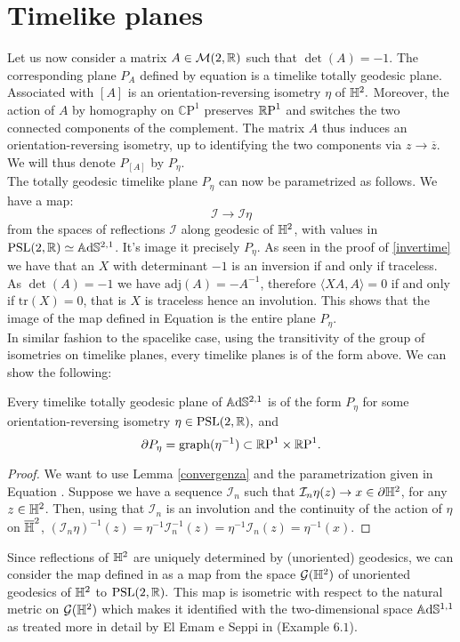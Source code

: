 \section{Timelike planes}
Let us now consider a matrix $A\in\mathcal{M}(2,\R)$ such that $\det(A)=-1.$ The corresponding plane $P_A$ defined by equation  is a timelike totally geodesic plane. Associated with $[A]$ is an orientation-reversing isometry $\eta$ of $\H^2.$ Moreover, the action of $A$ by homography on $\mathbb{C}\text{P}^1$ preserves $\S$ and switches the two connected components of the complement. The matrix $A$ thus induces an orientation-reversing isometry, up to identifying the two components via $z\to\overline{z}$. We will thus denote $P_{[A]}$ by $P_\eta$. \\
The totally geodesic timelike plane $P_\eta$ can now be parametrized as follows. We have a map: 
\begin{equation}\label{refspa}
    \mathcal{I}\to\mathcal{I}\eta
\end{equation}
from the spaces of reflections $\mathcal{I}$ along geodesic of $\H^2$, with values in $\PSL\simeq\A^{2,1}$. It's image it precisely $P_\eta.$ As seen in the proof of \ref{invertime} we have that an $X$ with determinant $-1$ is an inversion if and only if traceless. As $\det(A)=-1$ we have $\text{adj}(A)=-A^{-1}$, therefore $\langle XA,A\rangle=0$ if and only if $\text{tr}(X)=0$, that is $X$ is traceless hence an involution. This shows that the image of the map defined in Equation  is the entire plane $P_\eta$.\\  
In similar fashion to the spacelike case, using the transitivity of the group of isometries on timelike planes, every timelike planes is of the form above. We can show the following: 
\begin{lemma}\label{33}
    Every timelike totally geodesic plane of $\A^{2,1}$ is of the form $P_\eta$ for some orientation-reversing isometry $\eta\in\PSL,$ and 
    \[
        \partial P_\eta=\text{graph}(\eta^{-1})\subset\T.
    \]
\end{lemma}
\begin{proof}
    We want to use Lemma \ref{convergenza} and the parametrization given in Equation . Suppose we have a sequence $\mathcal{I}_n$ such that $\mathcal{I}_n\eta(z)\to x\in\partial\H^2$, for any $z\in\H^2$. Then, using that $\mathcal{I}_n$ is an involution and the continuity of the action of $\eta$ on $\overline{\H}^2$, $(\mathcal{I}_n\eta)^{-1}(z)=\eta^{-1}\mathcal{I}_n^{-1}(z)=\eta^{-1}\mathcal{I}_n(z)=\eta^{-1}(x).$ 
\end{proof}
\begin{observation}
    Since reflections of $\H^2$ are uniquely determined by (unoriented) geodesics, we can consider the map defined in  as a map from the space $\mathcal{G}(\H^2)$ of unoriented geodesics of $\H^2$ to $\PSL.$ This map is isometric with respect to the natural metric on $\mathcal{G}(\H^2)$ which makes it identified with the two-dimensional space $\A^{1,1}$ as treated more in detail by El Emam e Seppi in \cite{emam2022gauss} (Example $6.1$).
    \end{observation}

